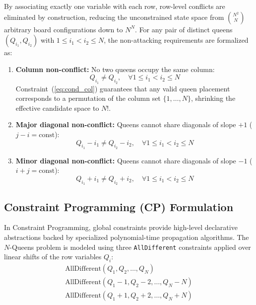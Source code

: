 \documentclass[a4paper,fleqn]{cas-sc}
\begin{document}
By associating exactly one variable with each row, row-level conflicts are eliminated by construction, reducing the unconstrained state space from $\binom{N^2}{N}$ arbitrary board configurations down to $N^N$. For any pair of distinct queens $(Q_{i_1}, Q_{i_2})$ with $1 \le i_1 < i_2 \le N$, the non-attacking requirements are formalized as:
\begin{enumerate}
    \item \textbf{Column non-conflict:} No two queens occupy the same column:
    \begin{equation}
        Q_{i_1} \ne Q_{i_2}, \quad \forall 1 \le i_1 < i_2 \le N \label{eq:cond_col}
    \end{equation}
    Constraint~(\ref{eq:cond_col}) guarantees that any valid queen placement corresponds to a permutation of the column set $\{1, \dots, N\}$, shrinking the effective candidate space to $N!$.
    \item \textbf{Major diagonal non-conflict:} Queens cannot share diagonals of slope $+1$ ($j - i = \text{const}$):
    \begin{equation}
        Q_{i_1} - i_1 \ne Q_{i_2} - i_2, \quad \forall 1 \le i_1 < i_2 \le N \label{eq:cond_diag_maj}
    \end{equation}
    \item \textbf{Minor diagonal non-conflict:} Queens cannot share diagonals of slope $-1$ ($i + j = \text{const}$):
    \begin{equation}
        Q_{i_1} + i_1 \ne Q_{i_2} + i_2, \quad \forall 1 \le i_1 < i_2 \le N \label{eq:cond_diag_min}
    \end{equation}
\end{enumerate}

\subsection{Constraint Programming (CP) Formulation}
\label{subsec:cp_formulation}
In Constraint Programming, global constraints provide high-level declarative abstractions backed by specialized polynomial-time propagation algorithms. The $N$-Queens problem is modeled using three \texttt{AllDifferent} constraints applied over linear shifts of the row variables $Q_i$:
\begin{align}
    \text{AllDifferent}(Q_1, Q_2, \dots, Q_N) \label{eq:cp_col} \\
    \text{AllDifferent}(Q_1 - 1, Q_2 - 2, \dots, Q_N - N) \label{eq:cp_diag1} \\
    \text{AllDifferent}(Q_1 + 1, Q_2 + 2, \dots, Q_N + N) \label{eq:cp_diag2}
\end{align}
\end{document}
